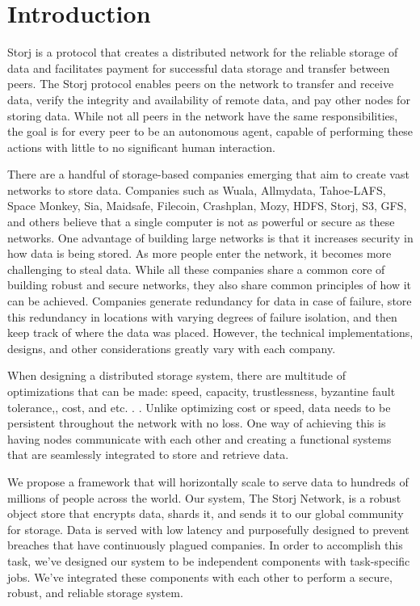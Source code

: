 \documentclass[a4paper,10pt]{article} \usepackage[utf8]{inputenc}
\begin{document}
\section{Introduction}

Storj is a protocol that creates a distributed network for the reliable storage
of data and facilitates payment for successful data storage and transfer
between peers.
The Storj protocol enables peers on the network to transfer and receive data,
verify the integrity and availability of remote data, and pay other nodes
for storing data.
While not all peers in the network have the same responsibilities,
the goal is for every peer to be an autonomous agent, capable of performing
these actions with little to no significant human interaction.


There are a handful of storage-based companies emerging that aim to create vast networks to store data. 
Companies such as Wuala, Allmydata, Tahoe-LAFS, Space Monkey, Sia, Maidsafe, Filecoin, Crashplan, Mozy, HDFS, 
Storj, S3, GFS,  and others believe that a single computer is not as powerful or secure as these networks. One advantage of 
building large networks is that it increases security in how data is being stored. As more people enter the network, it becomes more challenging to steal data.  While all these companies share a common core of building robust and secure networks, they also share common principles of how it can be achieved. Companies generate redundancy for data in case of failure, store this redundancy in locations with varying degrees of failure isolation, and then keep track of where the data was placed. However, the technical implementations, designs, and other considerations greatly vary with each company. 

When designing a distributed storage system, there are multitude of optimizations that can be made: speed, capacity, trustlessness, byzantine fault tolerance,, cost, and etc. . .  Unlike optimizing cost or speed, data needs to be persistent throughout the network with no loss. One way of achieving this is having nodes communicate with each other and creating a functional systems that are seamlessly integrated to store and retrieve data. 

We propose a framework that will horizontally scale to serve data to hundreds of millions of people across the world. Our system, The Storj Network, is a robust object store that encrypts data, shards it, and sends it to our global community for storage.  Data is served with low latency and purposefully designed to prevent breaches that have continuously plagued companies. In order to accomplish this task, we've designed our system to be independent components with task-specific jobs.  We've integrated these components with each other to perform a secure, robust, and reliable storage system.
\end{document}
